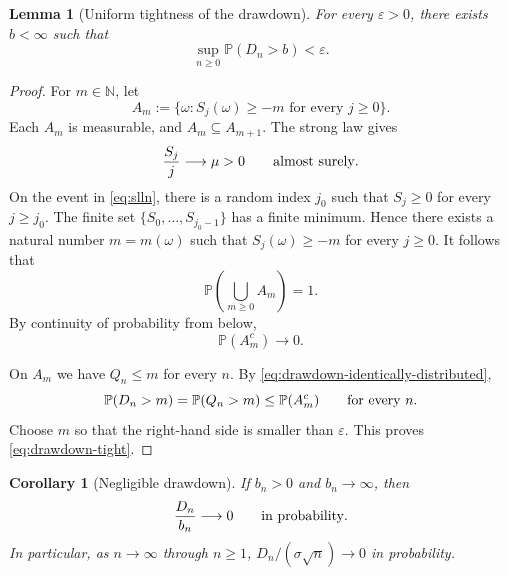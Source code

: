 \documentclass[10pt,reqno,a4paper]{amsart}
\numberwithin{equation}{section}
\theoremstyle{plain}
\newtheorem{lemma}[theorem]{Lemma}
\newtheorem{corollary}[theorem]{Corollary}
\theoremstyle{definition}
\theoremstyle{remark}
\newcommand{\N}{\mathbb{N}}
\newcommand{\Pp}{\mathbb{P}}
\newcommand{\1}{\mathbf{1}}
\begin{document}
\begin{lemma}[Uniform tightness of the drawdown]
\label{lem:drawdown-tight}
  For every $\varepsilon>0$, there exists $b<\infty$ such that
  \begin{equation}\label{eq:drawdown-tight}
    \sup_{n\geq0}\Pp(D_n>b)<\varepsilon.
  \end{equation}
\end{lemma}

\begin{proof}
  For $m\in\N$, let
  \begin{equation}\label{eq:lower-bound-event}
    A_m:=\{\omega:S_j(\omega)\geq-m\text{ for every }j\geq0\}.
  \end{equation}
  Each $A_m$ is measurable, and $A_m\subseteq A_{m+1}$.  The strong law gives
  \begin{equation}\label{eq:slln}
    \frac{S_j}{j}\longrightarrow\mu>0
    \qquad\hbox{almost surely}.
  \end{equation}
  On the event in \cref{eq:slln}, there is a random index $j_0$ such that
  $S_j\geq0$ for every $j\geq j_0$.  The finite set
  $\{S_0,\ldots,S_{j_0-1}\}$ has a finite minimum.  Hence there exists a
  natural number $m=m(\omega)$ such that $S_j(\omega)\geq-m$ for every
  $j\geq0$.  It follows that
  \begin{equation}\label{eq:lower-bound-exhaustion}
    \Pp\left(\bigcup_{m\geq0}A_m\right)=1.
  \end{equation}
  By continuity of probability from below,
  \begin{equation}\label{eq:lower-bound-probability}
    \Pp(A_m^c)\longrightarrow0.
  \end{equation}

  On $A_m$ we have $Q_n\leq m$ for every $n$.  By
  \cref{eq:drawdown-identically-distributed},
  \begin{equation}\label{eq:drawdown-tail-bound}
    \Pp(D_n>m)
    =\Pp(Q_n>m)
    \leq\Pp(A_m^c)
    \qquad\hbox{for every }n.
  \end{equation}
  Choose $m$ so that the right-hand side is smaller than $\varepsilon$.
  This proves \cref{eq:drawdown-tight}.
\end{proof}

\begin{corollary}[Negligible drawdown]
\label{cor:drawdown-negligible}
  If $b_n>0$ and $b_n\to\infty$, then
  \begin{equation}\label{eq:drawdown-in-probability}
    \frac{D_n}{b_n}\longrightarrow0
    \qquad\hbox{in probability}.
  \end{equation}
  In particular, as $n\to\infty$ through $n\geq1$,
  $D_n/(\sigma\sqrt n)\to0$ in probability.
\end{corollary}
\end{document}
